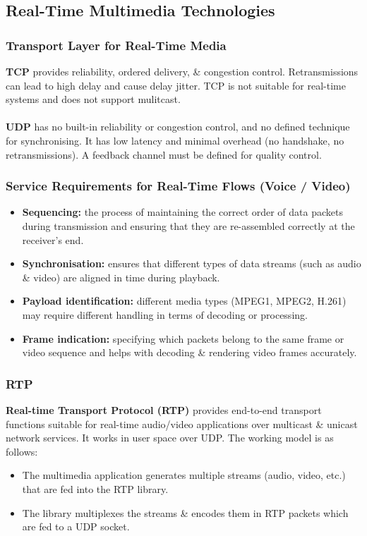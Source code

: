 \documentclass[a4paper,11pt]{article}
\begin{document}
\subsection{Real-Time Multimedia Technologies}
\subsubsection{Transport Layer for Real-Time Media}
\textbf{TCP} provides reliability, ordered delivery, \& congestion control.
Retransmissions can lead to high delay and cause delay jitter.
TCP is not suitable for real-time systems and does not support mulitcast.
\\\\
\textbf{UDP} has no built-in reliability or congestion control, and no defined technique for synchronising.
It has low latency and minimal overhead (no handshake, no retransmissions).
A feedback channel must be defined for quality control.

\subsubsection{Service Requirements for Real-Time Flows (Voice / Video)}
\begin{itemize}
    \item   \textbf{Sequencing:} the process of maintaining the correct order of data packets during transmission and ensuring that they are re-assembled correctly at the receiver's end.
    \item   \textbf{Synchronisation:} ensures that different types of data streams (such as audio \& video) are aligned in time during playback.
    \item   \textbf{Payload identification:} different media types (MPEG1, MPEG2, H.261) may require different handling in terms of decoding or processing.
    \item   \textbf{Frame indication:} specifying which packets belong to the same frame or video sequence and helps with decoding \& rendering video frames accurately.
\end{itemize}

\subsubsection{RTP}
\textbf{Real-time Transport Protocol (RTP)} provides end-to-end transport functions suitable for real-time audio/video applications over multicast \& unicast network services.
It works in user space over UDP.
The working model is as follows:
\begin{itemize}
    \item   The multimedia application generates multiple streams (audio, video, etc.) that are fed into the RTP library.
    \item   The library multiplexes the streams \& encodes them in RTP packets which are fed to a UDP socket.
\end{itemize}
\end{document}

